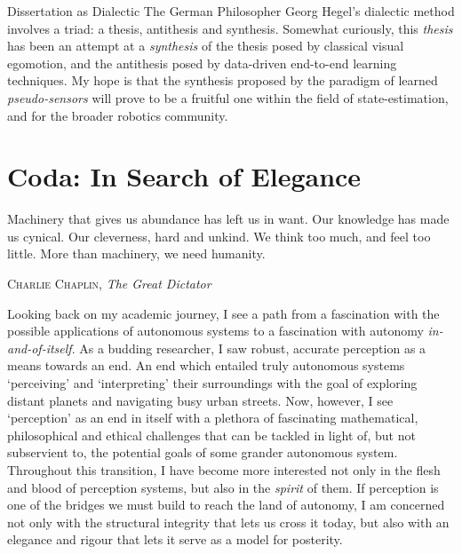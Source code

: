 \begin{remark}{Dissertation as Dialectic}
The German Philosopher Georg Hegel's dialectic method involves a triad: a thesis, antithesis and synthesis.
Somewhat curiously, this \textit{thesis} has been an attempt at a \textit{synthesis} of the thesis posed by classical visual egomotion, and the antithesis posed by data-driven end-to-end learning techniques.
My hope is that the synthesis proposed by the paradigm of learned \textit{pseudo-sensors} will prove to be a fruitful one within the field of state-estimation, and for the broader robotics community. 
\end{remark}
\section{Coda: In Search of Elegance}
\epigraph{Machinery that gives us abundance has left us in want.
Our knowledge has made us cynical.
Our cleverness, hard and unkind.
We think too much, and feel too little.
More than machinery, we need humanity.}{\textsc{Charlie Chaplin}, \textit{The Great Dictator}}


Looking back on my academic journey, I see a path from a fascination with the possible applications of autonomous systems to a fascination with autonomy \textit{in-and-of-itself}. As a budding researcher, I saw robust, accurate perception as a means towards an end. An end which entailed truly autonomous systems `perceiving' and `interpreting' their surroundings with the goal of exploring distant planets and navigating busy urban streets. Now, however, I see `perception' as an end in itself with a plethora of fascinating mathematical, philosophical and ethical challenges that can be tackled in light of, but not subservient to, the potential goals of some grander autonomous system. Throughout this transition, I have become more interested not only in the flesh and blood of perception systems, but also in the \textit{spirit} of them. If perception is one of the bridges we must build to reach the land of autonomy, I am concerned not only with the structural integrity that lets us cross it today, but also with an elegance and rigour that lets it serve as a model for posterity. 

